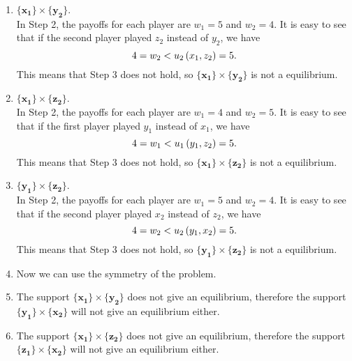 \begin{enumerate} [label=\Alph*. ]
\begin{enumerate} [label*= (\arabic*)]
	\item $\mathbf{\{x_1\}} \times \mathbf{\{y_2\}}$. \\
	      In Step 2, the payoffs for each player are $w_1 = 5$ and $w_2 = 4$. It is easy to see that if the second player played $z_2$ instead of $y_2$, we have
	      \begin{equation*}
	      	4 = w_2 < u_2 \left(x_1, z_2\right) = 5.
	      \end{equation*}
	      This means that Step 3 does not hold, so $\mathbf{\{x_1\}} \times \mathbf{\{y_2\}}$ is not a equilibrium.
	          
	\item $\mathbf{\{x_1\}} \times \mathbf{\{z_2\}}$. \\
	      In Step 2, the payoffs for each player are $w_1 = 4$ and $w_2 = 5$. It is easy to see that if the first player played $y_1$ instead of $x_1$, we have
	      \begin{equation*}
	      	4 = w_1 < u_1 \left(y_1, z_2\right) = 5.
	      \end{equation*}
	      This means that Step 3 does not hold, so $\mathbf{\{x_1\}} \times \mathbf{\{z_2\}}$ is not a equilibrium.
	      
	\item $\mathbf{\{y_1\}} \times \mathbf{\{z_2\}}$. \\
	      In Step 2, the payoffs for each player are $w_1 = 5$ and $w_2 = 4$. It is easy to see that if the second player played $x_2$ instead of $z_2$, we have
	      \begin{equation*}
	      	4 = w_2 < u_2 \left(y_1, x_2\right) = 5.
	      \end{equation*}
	      This means that Step 3 does not hold, so $\mathbf{\{y_1\}} \times \mathbf{\{z_2\}}$ is not a equilibrium.
	      
	\vspace{3mm}
	
	\item[] Now we can use the symmetry of the problem.
	
	\item The support $\mathbf{\{x_1\}} \times \mathbf{\{y_2\}}$ does not give an equilibrium, therefore the support $\mathbf{\{y_1\}} \times \mathbf{\{x_2\}}$ will not give an equilibrium either.
	
	\item The support $\mathbf{\{x_1\}} \times \mathbf{\{z_2\}}$ does not give an equilibrium, therefore the support $\mathbf{\{z_1\}} \times \mathbf{\{x_2\}}$ will not give an equilibrium either.
	

\end{enumerate}
\end{enumerate}
